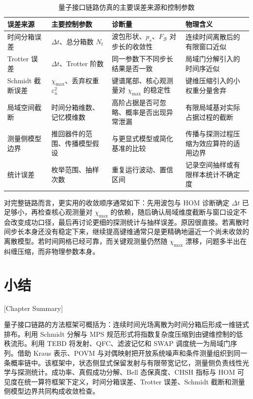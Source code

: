 \begin{table}[htbp]
  
\centering
  
\caption{量子接口链路仿真的主要误差来源和控制参数}
  
\label{tab:ch2-errors}
  
\begin{tabular}{p{2.6cm}p{2.6cm}p{4.0cm}p{4.8cm}}
    
\toprule
    误差来源 & 主要控制参数 & 诊断量 & 物理含义 \\
    
\midrule
    时间分箱误差 & $\Delta t$、总分箱数 $N_t$ & 波包形状、$p_s$、$F_{\mathcal B}$ 对步长的收敛性 & 连续时间离散后的有限窗口近似\\
    Trotter 误差 & $\Delta t$、Trotter 阶数 & 同一参数下不同步长结果是否一致 & 局域门分解引入的时间序近似\\
    Schmidt 截断误差 & $\chi_{\max}$、丢弃权重 $\varepsilon_n^2$ & 键谱尾部、核心观测量对 $\chi_{\max}$ 的稳定性 & 键维压缩引入的小权重分量舍弃\\
    局域空间截断 & 时间分箱维数、记忆模维数 & 高阶占据是否可忽略、概率是否出现异常泄漏 & 有限局域基对实际占据过程的截断\\
    测量侧模型边界 & 推回器件的范围、传播模型假设 & 与更显式模型或简化基准的比较 & 传播与探测过程压缩为效应算符的适用边界\\
    统计误差 & 枚举范围、抽样次数 & 重复运行波动、置信区间 & 记录空间抽样或有限样本统计不确定度\\
    
\bottomrule
  
\end{tabular}
\end{table}


对完整链路而言，更实用的收敛顺序通常如下：先用波包与 HOM 诊断确定 $\Delta t$ 已足够小，再检查核心观测量对 $\chi_{\max}$ 的依赖，随后确认局域维度截断与窗口设定不会改变成功口径，最后再讨论更细的探测统计与抽样误差。原因很直接。若离散时间步长本身还没有稳定下来，继续提高键维通常只是更精确地逼近一个尚未收敛的离散模型。若时间网格已经可靠，而关键观测量仍然随 $\chi_{\max}$ 漂移，问题多半出在纠缠压缩，而非物理参数本身。

\section{小结}[Chapter Summary]

量子接口链路的方法框架可概括为：连续时间光场离散为时间分箱后形成一维链式排布。利用 Schmidt 分解与 MPS 规范形式将指数复杂度压缩到由键维控制的低秩流形。利用 TEBD 将发射、QFC、滤波记忆和 SWAP 调度统一为局域门序列。借助 Kraus 表示、POVM 与对偶映射把开放系统噪声和条件测量组织到同一条概率链中。该框架中，状态侧显式保留发射与有限带宽记忆，测量侧负责线性光学与探测统计。成功率、真假成功分解、Bell 态保真度、CHSH 指标与 HOM 可见度在统一算符框架下定义，时间分箱误差、Trotter 误差、Schmidt 截断和测量侧模型边界共同构成收敛检查。
